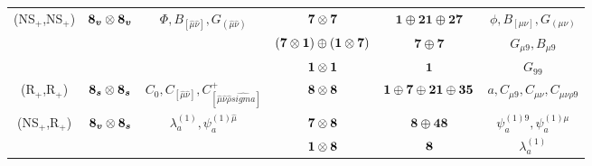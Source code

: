 {\begin{tabular}{|cccccc|}
    \multicolumn{1}{|c|}{\multirow{3}{*}{(NS$_+$,NS$_+$)}} & \multicolumn{1}{c|}{\multirow{3}{*}{$\boldsymbol{8_v} \otimes \boldsymbol{8_v}$}} & \multicolumn{1}{c|}{\multirow{3}{*}{$\Phi, B_{[\hat{\mu}\hat{\nu}]}, G_{(\hat{\mu}\hat{\nu})}$}}      & \multicolumn{1}{c|}{$\boldsymbol{7} \otimes \boldsymbol{7}$}                          & \multicolumn{1}{c|}{$\boldsymbol{1} \oplus \boldsymbol{21}\oplus\boldsymbol{27}$}     & $\phi, B_{[\mu\nu]}, G_{(\mu\nu)}$         \\ \cline{4-6} 
    \multicolumn{1}{|c|}{}                                 & \multicolumn{1}{c|}{}                                 & \multicolumn{1}{c|}{}                                                                                 & \multicolumn{1}{c|}{$(\boldsymbol{7} \otimes \boldsymbol{1}) \oplus (\boldsymbol{1} \otimes \boldsymbol{7})$} & \multicolumn{1}{c|}{$\boldsymbol{7}\oplus \boldsymbol{7}$}                            & $G_{\mu9}, B_{\mu9}$                       \\ \cline{4-6} 
    \multicolumn{1}{|c|}{}                                 & \multicolumn{1}{c|}{}                                 & \multicolumn{1}{c|}{}                                                                                 & \multicolumn{1}{c|}{$\boldsymbol{1} \otimes \boldsymbol{1}$}                                  & \multicolumn{1}{c|}{$\boldsymbol{1}$}                                                 & $G_{99}$                                   \\ \hline
    \multicolumn{1}{|c|}{(R$_+$,R$_+$)}                    & \multicolumn{1}{c|}{$\boldsymbol{8_s} \otimes \boldsymbol{8_s}$}                  & \multicolumn{1}{c|}{$C_0, C_{[\hat{\mu}\hat{\nu}]}, C_{[\hat{\mu}\hat{\nu}\hat{\rho}\hat{sigma}]}^+$} & \multicolumn{1}{c|}{$\boldsymbol{8} \otimes \boldsymbol{8}$}                          & \multicolumn{1}{c|}{$\boldsymbol{1} \oplus \boldsymbol{7} \oplus \boldsymbol{21} \oplus \boldsymbol{35}$} & $a, C_{\mu9}, C_{\mu\nu}, C_{\mu\nu\rho9}$ \\ \hline
    \multicolumn{1}{|c|}{\multirow{2}{*}{(NS$_+$,R$_+$)}}  & \multicolumn{1}{c|}{\multirow{2}{*}{$\boldsymbol{8_v} \otimes \boldsymbol{8_s}$}} & \multicolumn{1}{c|}{\multirow{2}{*}{${\lambda}_a^{(1)}, {\psi}^{(1)\hat{\mu}}_a$}}                    & \multicolumn{1}{c|}{$\boldsymbol{7} \otimes \boldsymbol{8}$}                          & \multicolumn{1}{c|}{$\boldsymbol{8} \oplus\boldsymbol{48}$}                           & $\psi^{(1)9}_a, \psi^{(1)\mu}_a$           \\ \cline{4-6} 
    \multicolumn{1}{|c|}{}                                 & \multicolumn{1}{c|}{}                                 & \multicolumn{1}{c|}{}                                                                                 & \multicolumn{1}{c|}{$\boldsymbol{1} \otimes \boldsymbol{8}$}                              & \multicolumn{1}{c|}{$\boldsymbol{8}$}                                                         & $\lambda^{(1)}_a$                          \\ \hline

\end{tabular}}
